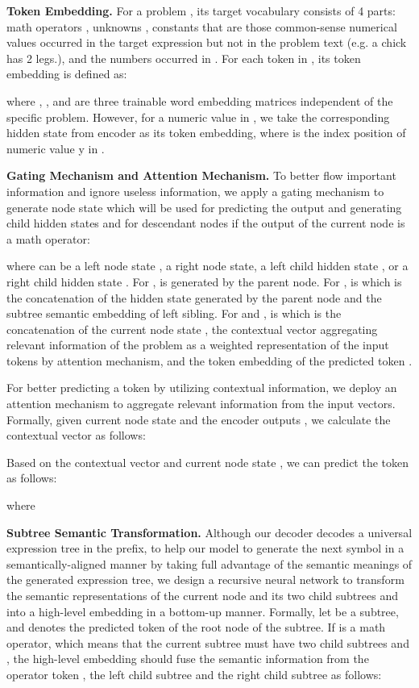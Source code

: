 \documentclass[11pt,a4paper]{article}
\begin{document}
\noindent\textbf{Token Embedding.} For a problem , its target vocabulary  consists of 4 parts: math operators , unknowns , constants  that are those common-sense numerical values occurred in the target expression but not in the problem text (e.g. a chick has 2 legs.), and the numbers  occurred in . For each token  in , its token embedding  is defined as:
\vspace{-3mm}

where , , and  are three trainable word embedding matrices independent of the specific problem. However, for a numeric value in , we take the corresponding hidden state  from encoder as its token embedding, where  is the index position of numeric value y in .

\noindent\textbf{Gating Mechanism and Attention Mechanism.} To better flow important information and ignore useless information, we apply a gating mechanism to generate node state  which will be used for predicting the output and generating child hidden states  and  for descendant nodes if the output of the current node is a math operator:

where  can be a left node state , a right node state, a left child hidden state , or a right child hidden state . For ,  is  generated by the parent node. For ,  is  which is the concatenation of the hidden state  generated by the parent node and the subtree semantic embedding  of left sibling. For  and ,  is  which is the concatenation of the current node state , the contextual vector  aggregating relevant information of the problem as a weighted representation of the input tokens by attention mechanism, and the token embedding  of the predicted token . 

For better predicting a token  by utilizing contextual information, we deploy an attention mechanism to aggregate relevant information from the input vectors. Formally, given current node state  and the encoder outputs , we calculate the contextual vector  as follows:

Based on the contextual vector  and current node state , we can predict the token  as follows:

where 


\noindent\textbf{Subtree Semantic Transformation.} Although our decoder decodes a universal expression tree in the prefix, to help our model to generate the next symbol in a semantically-aligned manner by taking full advantage of the semantic meanings of the generated expression tree, we design a recursive neural network to transform the semantic representations of the current node and its two child subtrees  and  into a high-level embedding  in a bottom-up manner. Formally, let  be a subtree, and  denotes the predicted token of the root node of the subtree. If  is a math operator, which means that the current subtree  must have two child subtrees  and , the high-level embedding  should fuse the semantic information from the operator token , the left child subtree  and the right child subtree  as follows:
\end{document}
